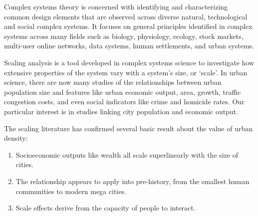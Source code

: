 Complex systems theory is concerned with identifying and characterizing common design elements that are observed across diverse natural, technological and social complex systems. It focuses on general principles  identified in complex systems across many fields such as biology, physiology, ecology, stock markets, multi-user online  networks, data systems, human settlements, and urban systems.

Scaling analysis is a tool developed in complex systems science to investigate how extensive properties of the system vary with a system's size,  or `scale'.  In urban science, there are now many studies of  the relationships between urban population size and  features like urban economic output,  area, growth, traffic congestion costs, and even social  indicators like crime and homicide rates. Our particular interest is in studies linking city population  and  economic output. 

The scaling literature has confirmed several basic result about the value of urban density:

\begin{enumerate}
 \item Socioeconomic outputs like wealth all scale superlinearly with the size of cities. 
\item The relationship appears to apply into pre-history, from the smallest human communities to modern mega cities. %
\item Scale effects derive from the capacity of people to interact.
\end{enumerate}



